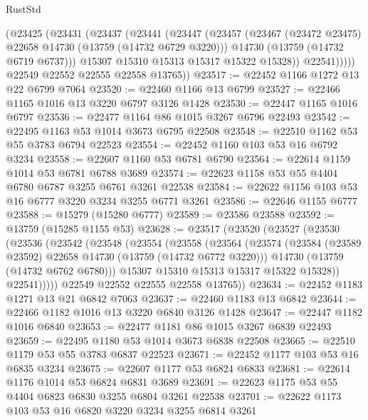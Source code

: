 \begin{lexlean}{RustStd}
\begin{coremodule}
            (@23425
              (@23431
                (@23437
                  (@23441
                    (@23447
                      (@23457
                        (@23467 (@23472 @23475) @22658 @14730 (@13759 (@14732 @6729 @3220)))
                        @14730
                        (@13759 (@14732 @6719 @6737)))
                      @15307
                      @15310
                      @15313
                      @15317
                      @15322
                      @15328))
                  @22541)))))
        @22549
        @22552
        @22555
        @22558
        @13765))
@23517 := @22452 @1166 @1272 @13 @22 @6799 @7064
@23520 := @22460 @1166 @13 @6799
@23527 := @22466 @1165 @1016 @13 @3220 @6797 @3126 @1428
@23530 := @22447 @1165 @1016 @6797
@23536 := @22477 @1164 @86 @1015 @3267 @6796 @22493
@23542 := @22495 @1163 @53 @1014 @3673 @6795 @22508
@23548 := @22510 @1162 @53 @55 @3783 @6794 @22523
@23554 := @22452 @1160 @103 @53 @16 @6792 @3234
@23558 := @22607 @1160 @53 @6781 @6790
@23564 := @22614 @1159 @1014 @53 @6781 @6788 @3689
@23574 := @22623 @1158 @53 @55 @4404 @6780 @6787 @3255 @6761 @3261 @22538
@23584 := @22622 @1156 @103 @53 @16 @6777 @3220 @3234 @3255 @6771 @3261
@23586 := @22646 @1155 @6777
@23588 := @15279 (@15280 @6777)
@23589 := @23586 @23588
@23592 := @13759 (@15285 @1155 @53)
@23628 := @23517
    (@23520
      (@23527
        (@23530
          (@23536
            (@23542
              (@23548
                (@23554
                  (@23558
                    (@23564
                      (@23574
                        (@23584 (@23589 @23592) @22658 @14730 (@13759 (@14732 @6772 @3220)))
                        @14730
                        (@13759 (@14732 @6762 @6780)))
                      @15307
                      @15310
                      @15313
                      @15317
                      @15322
                      @15328))
                  @22541)))))
        @22549
        @22552
        @22555
        @22558
        @13765))
@23634 := @22452 @1183 @1271 @13 @21 @6842 @7063
@23637 := @22460 @1183 @13 @6842
@23644 := @22466 @1182 @1016 @13 @3220 @6840 @3126 @1428
@23647 := @22447 @1182 @1016 @6840
@23653 := @22477 @1181 @86 @1015 @3267 @6839 @22493
@23659 := @22495 @1180 @53 @1014 @3673 @6838 @22508
@23665 := @22510 @1179 @53 @55 @3783 @6837 @22523
@23671 := @22452 @1177 @103 @53 @16 @6835 @3234
@23675 := @22607 @1177 @53 @6824 @6833
@23681 := @22614 @1176 @1014 @53 @6824 @6831 @3689
@23691 := @22623 @1175 @53 @55 @4404 @6823 @6830 @3255 @6804 @3261 @22538
@23701 := @22622 @1173 @103 @53 @16 @6820 @3220 @3234 @3255 @6814 @3261

\end{coremodule}
\end{lexlean}
